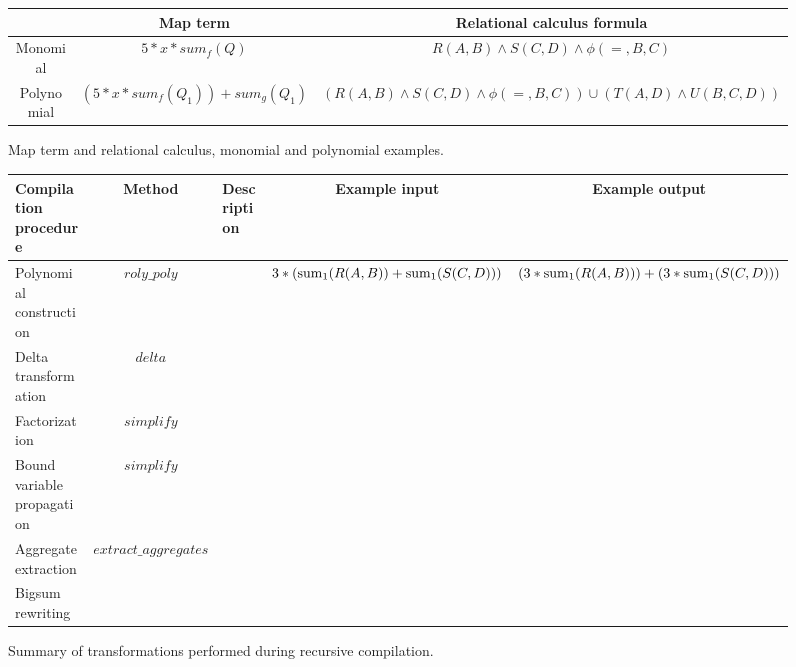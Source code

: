 
\begin{figure*}[htbp]
\begin{center}
\begin{tabular}{c|c|c}
           & Map term & Relational calculus formula\\
\hline
Monomial   & $5*x*sum_{f}(Q)$
           & $R(A,B) \wedge S(C,D) \wedge \phi(=,B,C)$\\
Polynomial & $(5*x*sum_{f}(Q_1)) + sum_g(Q_1) $
           & $(R(A,B) \wedge S(C,D) \wedge \phi(=,B,C)) \cup (T(A,D) \wedge U(B,C,D))$
\end{tabular}
\label{tbl:monpolyex}
\caption{Map term and relational calculus, monomial and polynomial examples.}
\end{center}
\end{figure*}

\begin{figure*}
\begin{tabular}{l|c|l|c|c}
Compilation procedure & Method & Description & Example input & Example output \\
\hline
Polynomial construction     & $roly\_poly$ &
& $3 * (\mathrm{sum}_{1}(R(A,B)) + \mathrm{sum}_{1}(S(C,D)))$
& $(3*\mathrm{sum}_{1}(R(A,B))) + (3*\mathrm{sum}_{1}(S(C,D)))$
\\
Delta transformation        & $delta$ &
&
&
\\
Factorization               & $simplify$ &
&
&
\\
Bound variable propagation  & $simplify$ &
&
&
\\
Aggregate extraction        & $extract\_aggregates$ &
&
&
\\
Bigsum rewriting            & &
&
&
\\
\end{tabular}
\caption{Summary of transformations performed during recursive compilation.}
\label{fig:methodsummary}
\end{figure*}

